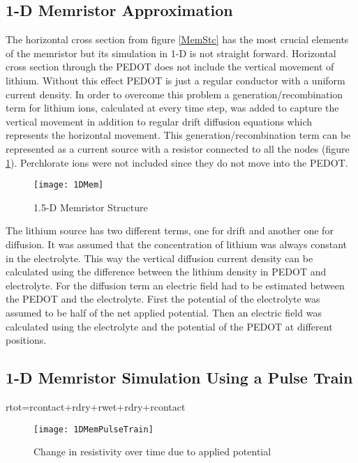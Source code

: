 {\clearpage
\subsection{1-D Memristor Approximation}

The horizontal cross section from figure \ref{MemStc} has the most crucial elements of the memristor but its simulation in 1-D is not straight forward. Horizontal cross section through the PEDOT does not include the vertical movement of lithium. Without this effect PEDOT is just a regular conductor with a uniform current density. In order to overcome this problem a generation/recombination term for lithium ions, calculated at every time step, was added to capture the vertical movement in addition to regular drift diffusion equations which represents the horizontal movement. This generation/recombination term can be represented as a current source with a resistor connected to all the nodes (figure \ref{MemStc15}). Perchlorate ions were not included since they do not move into the PEDOT.

\begin{figure}[!htp]
\centering
\texttt{[image: 1DMem]}
\caption{1.5-D Memristor Structure} 
\label{MemStc15}
\end{figure}

The lithium source has two different terms, one for drift and another one for diffusion. It was assumed that the concentration of lithium was always constant in the electrolyte. This way the vertical diffusion current density can be calculated using the difference between the lithium density in PEDOT and electrolyte. For the diffusion term an electric field had to be estimated between the PEDOT and the electrolyte. First the potential of the electrolyte was assumed to be half of the net applied potential. Then an electric field was calculated using the electrolyte and the potential of the PEDOT at different positions.
 
 \clearpage
 \subsection{1-D Memristor Simulation Using a Pulse Train}
  
rtot=rcontact+rdry+rwet+rdry+rcontact

\begin{figure}[!htp]
\centering
\texttt{[image: 1DMemPulseTrain]}
\caption{Change in resistivity over time due to applied potential} 
\label{MemRes}
\end{figure}

}
